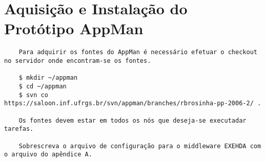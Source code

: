 \chapter{Aquisição e Instalação do Protótipo AppMan}
\label{anexo:appman}

\begin{scriptsize}
\begin{verbatim}
	Para adquirir os fontes do AppMan é necessário efetuar o checkout no servidor onde encontram-se os fontes.

	$ mkdir ~/appman
	$ cd ~/appman	
	$ svn co https://saloon.inf.ufrgs.br/svn/appman/branches/rbrosinha-pp-2006-2/ .
	
	Os fontes devem estar em todos os nós que deseja-se executadar tarefas.
	
	Sobrescreva o arquivo de configuração para o middleware EXEHDA com o arquivo do apêndice A.
	
	
	
\end{verbatim}
\end{scriptsize}